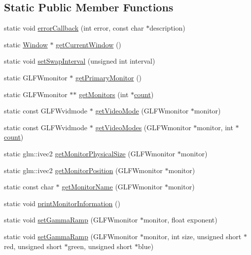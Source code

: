 \subsection*{Static Public Member Functions}
\begin{DoxyCompactItemize}
\item 
static void \mbox{\hyperlink{classec_1_1_window_a1d202aaa954ea0b62cf380fb48288107}{error\+Callback}} (int error, const char $\ast$description)
\item 
static \mbox{\hyperlink{classec_1_1_window}{Window}} $\ast$ \mbox{\hyperlink{classec_1_1_window_aca8cec4837055174791755b5bdef5949}{get\+Current\+Window}} ()
\item 
static void \mbox{\hyperlink{classec_1_1_window_a42f80dede17ab5a599b4cadf0b621d90}{set\+Swap\+Interval}} (unsigned int interval)
\item 
static G\+L\+F\+Wmonitor $\ast$ \mbox{\hyperlink{classec_1_1_window_ae519ec5a903d9ed1cefec30a4571a938}{get\+Primary\+Monitor}} ()
\item 
static G\+L\+F\+Wmonitor $\ast$$\ast$ \mbox{\hyperlink{classec_1_1_window_a535eb59e75e88a2a9254e25f4dc878dc}{get\+Monitors}} (int $\ast$\mbox{\hyperlink{namespaceec_a4dc8d59c4e90842e057344aefde0efbd}{count}})
\item 
static const G\+L\+F\+Wvidmode $\ast$ \mbox{\hyperlink{classec_1_1_window_a1be4ec4d16ead306b318e69b166d9bc9}{get\+Video\+Mode}} (G\+L\+F\+Wmonitor $\ast$monitor)
\item 
static const G\+L\+F\+Wvidmode $\ast$ \mbox{\hyperlink{classec_1_1_window_aeedb0015b967b685cd4e8facc3b37a77}{get\+Video\+Modes}} (G\+L\+F\+Wmonitor $\ast$monitor, int $\ast$\mbox{\hyperlink{namespaceec_a4dc8d59c4e90842e057344aefde0efbd}{count}})
\item 
static glm\+::ivec2 \mbox{\hyperlink{classec_1_1_window_ace0f9940b132f4c072e1b2a1a6f72217}{get\+Monitor\+Physical\+Size}} (G\+L\+F\+Wmonitor $\ast$monitor)
\item 
static glm\+::ivec2 \mbox{\hyperlink{classec_1_1_window_aa7be3b867cfa6fa26f347eaa6a1d92ee}{get\+Monitor\+Position}} (G\+L\+F\+Wmonitor $\ast$monitor)
\item 
static const char $\ast$ \mbox{\hyperlink{classec_1_1_window_ad382278721c5532b83962bcd5e405d17}{get\+Monitor\+Name}} (G\+L\+F\+Wmonitor $\ast$monitor)
\item 
static void \mbox{\hyperlink{classec_1_1_window_aed6043c22655278bcb7d196b2a4ded82}{print\+Monitor\+Information}} ()
\item 
static void \mbox{\hyperlink{classec_1_1_window_a53def2c77bb150fade5085d9dcfdb1e1}{set\+Gamma\+Ramp}} (G\+L\+F\+Wmonitor $\ast$monitor, float exponent)
\item 
static void \mbox{\hyperlink{classec_1_1_window_aa23ab7022526a507f9a26c673f62d270}{set\+Gamma\+Ramp}} (G\+L\+F\+Wmonitor $\ast$monitor, int size, unsigned short $\ast$red, unsigned short $\ast$green, unsigned short $\ast$blue)
\end{DoxyCompactItemize}
